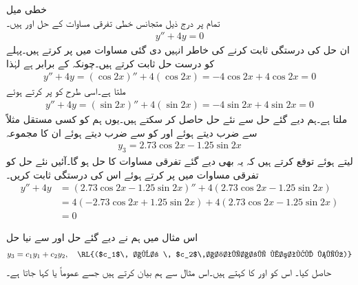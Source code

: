 \quad خطی میل\\
تمام  پر درج ذیل متجانس خطی تفرقی مساوات کے حل  اور  ہیں۔
\begin{align}
y''+4y=0
\end{align}
ان حل کی درستگی ثابت کرنے کی خاطر انہیں دی گئی مساوات میں پر کرتے ہیں۔پہلے  کو درست حل ثابت کرتے ہیں۔چونکہ  کے برابر ہے لہٰذا 
\begin{align*}
y''+4y=(\cos 2x)''+4(\cos 2x)=-4\cos 2x+4\cos 2x=0
\end{align*}
ملتا ہے۔اسی طرح  کو پر کرتے ہوئے 
\begin{align*}
y''+4y=(\sin 2x)''+4(\sin 2x)=-4\sin 2x+4\sin 2x=0
\end{align*}
ملتا ہے۔ہم دیے گئے حل سے نئے حل حاصل کر سکتے ہیں۔یوں ہم  کو کسی مستقل مثلاً  سے ضرب دیتے ہوئے اور  کو   سے ضرب دیتے ہوئے ان کا مجموعہ
\begin{align*}
y_3=2.73\cos 2x-1.25\sin 2x
\end{align*}
لیتے ہوئے  توقع کرتے ہیں کہ یہ بھی دیے گئے تفرقی مساوات کا حل ہو گا۔آئیں نئے حل کو تفرقی مساوات میں پر کرتے ہوئے اس کی درستگی ثابت کریں۔
\begin{align*}
y''+4y&=(2.73\cos 2x-1.25\sin 2x)''+4(2.73\cos 2x-1.25\sin 2x)\\
&=4(-2.73\cos 2x+1.25\sin 2x)+4(2.73\cos 2x-1.25\sin 2x)\\
&=0
\end{align*}

اس مثال میں ہم نے دیے گئے حل  اور  سے نیا حل 
\begin{align}
y_3=c_1 y_1+c_2 y_2, \quad \text{\RL{($c_1$\, اور \, $c_2$\,اختیاری مستقل ہیں)}}
\end{align}
حاصل کیا۔ اس کو  اور  کا  کہتے ہیں۔اس مثال سے ہم  بیان کرتے ہیں جسے عموماً  یا  کہا جاتا ہے۔



